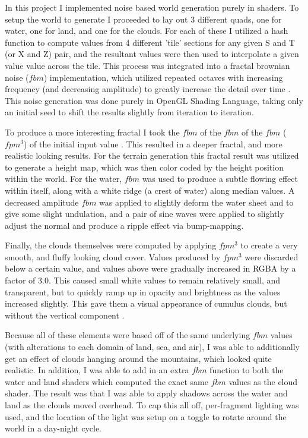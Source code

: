 \documentclass[12pt,letterpaper]{article}
\begin{document}
In this project I implemented noise based world generation purely in shaders. To setup the world to generate I proceeded to lay out 3 different quads, one for water, one for land, and one for the clouds. For each of these I utilized a hash function to compute values from 4 different 'tile' sections for any given S and T (or X and Z) pair, and the resultant values were then used to interpolate a given value value across the tile. This process was integrated into a fractal brownian noise ($fbm$) implementation, which utilized repeated octaves with increasing frequency (and decreasing  amplitude) to greatly increase the detail over time \cite{fractional_brownian_motion}. This noise generation was done purely in OpenGL Shading Language, taking only an initial seed to shift the results slightly from iteration to iteration.


To produce a more interesting fractal I took the $fbm$ of the $fbm$ of the $fbm$ ($fpm^3$) of the initial input value \cite{shader_book}. This resulted in a deeper fractal, and more realistic looking results. For the terrain generation this fractal result was utilized to generate a height map, which was then color coded by the height position within the world. For the water, $fbm$ was used to produce a subtle flowing effect within itself, along with a white ridge (a crest of water) along median values. A decreased amplitude $fbm$ was applied to slightly deform the water sheet and to give some slight undulation, and a pair of sine waves were applied to slightly adjust the normal and produce a ripple effect via bump-mapping.


Finally, the clouds themselves were computed by applying $fpm^3$ to create a very smooth, and fluffy looking cloud cover. Values produced by $fpm^3$ were discarded below a certain value, and values above were gradually increased in RGBA by a factor of 3.0. This caused small white values to remain relatively small, and transparent, but to quickly ramp up in opacity and brightness as the values increased slightly. This gave them a visual appearance of cumulus clouds, but without the vertical component \cite{clouds}.


Because all of these elements were based off of the same underlying $fbm$ values (with alterations to each domain of land, sea, and air), I was able to additionally get an effect of clouds hanging around the mountains, which looked quite realistic. In addition, I was able to add in an extra $fbm$ function to both the water and land shaders which computed the exact same $fbm$ values as the cloud shader. The result was that I was able to apply shadows across the water and land as the clouds moved overhead. To cap this all off, per-fragment lighting was used, and the location of the light was setup on a toggle to rotate around the world in a day-night cycle.
\end{document}
